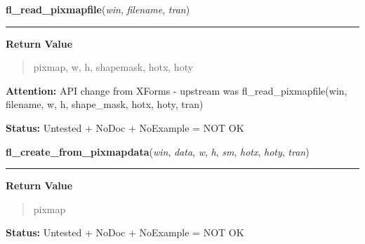\hspace{.8\funcindent}\begin{boxedminipage}{\funcwidth}

    \raggedright \textbf{fl\_read\_pixmapfile}(\textit{win}, \textit{filename}, \textit{tran})

    \vspace{-1.5ex}

    \rule{\textwidth}{0.5\fboxrule}
\setlength{\parskip}{2ex}
\setlength{\parskip}{1ex}
      \textbf{Return Value}
    \vspace{-1ex}

      \begin{quote}
      pixmap, w, h, shapemask, hotx, hoty

      \end{quote}

\textbf{Attention:} API change from XForms - upstream was fl\_read\_pixmapfile(win, filename, 
w, h, shape\_mask, hotx, hoty, tran)



\textbf{Status:} Untested + NoDoc + NoExample = NOT OK



    \end{boxedminipage}

    \label{xformslib:library:fl_create_from_pixmapdata}

    \vspace{0.5ex}

\hspace{.8\funcindent}\begin{boxedminipage}{\funcwidth}

    \raggedright \textbf{fl\_create\_from\_pixmapdata}(\textit{win}, \textit{data}, \textit{w}, \textit{h}, \textit{sm}, \textit{hotx}, \textit{hoty}, \textit{tran})

    \vspace{-1.5ex}

    \rule{\textwidth}{0.5\fboxrule}
\setlength{\parskip}{2ex}
\setlength{\parskip}{1ex}
      \textbf{Return Value}
    \vspace{-1ex}

      \begin{quote}
      pixmap

      \end{quote}

\textbf{Status:} Untested + NoDoc + NoExample = NOT OK



    \end{boxedminipage}

